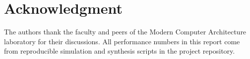 \section*{Acknowledgment}
The authors thank the faculty and peers of the Modern Computer Architecture laboratory for their
discussions. All performance numbers in this report come from reproducible simulation and
synthesis scripts in the project repository. %
